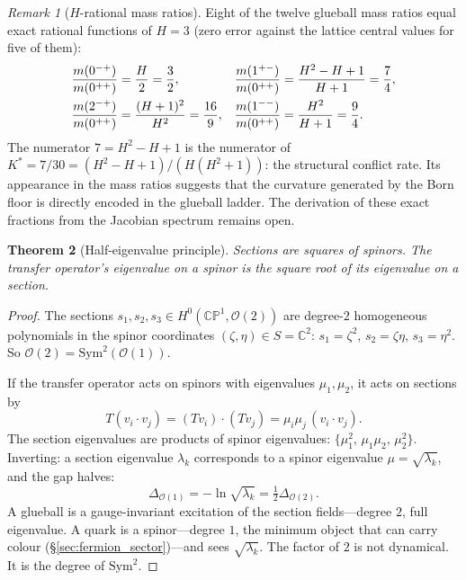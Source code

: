 \documentclass[11pt,a4paper]{article}
\newtheorem{theorem}{Theorem}[section]
\theoremstyle{definition}
\theoremstyle{remark}
\newtheorem{remark}[theorem]{Remark}
\newcommand{\CP}{\mathbb{CP}}
\newcommand{\C}{\mathbb{C}}
\newcommand{\Sym}{\mathrm{Sym}}
\begin{document}
\begin{remark}[$H$-rational mass ratios]\label{rem:h_rational}
Eight of the twelve glueball mass ratios equal exact rational functions of $H=3$ (zero error against the lattice central values for five of them):
\begin{align}
\frac{m(0^{-+})}{m(0^{++})} &= \frac{H}{2} = \frac{3}{2}, &
\frac{m(1^{+-})}{m(0^{++})} &= \frac{H^2-H+1}{H+1} = \frac{7}{4}, \notag \\
\frac{m(2^{-+})}{m(0^{++})} &= \frac{(H+1)^2}{H^2} = \frac{16}{9}, &
\frac{m(1^{--})}{m(0^{++})} &= \frac{H^2}{H+1} = \frac{9}{4}. \label{eq:h_ratios}
\end{align}
The numerator $7=H^2-H+1$ is the numerator of $K^*=7/30=(H^2-H+1)/(H(H^2+1))$: the structural conflict rate. Its appearance in the mass ratios suggests that the curvature generated by the Born floor is directly encoded in the glueball ladder. The derivation of these exact fractions from the Jacobian spectrum remains open.
\end{remark}

\begin{theorem}[Half-eigenvalue principle]\label{thm:half_eigenvalue}
Sections are squares of spinors. The transfer operator's eigenvalue on a spinor is the square root of its eigenvalue on a section.
\end{theorem}

\begin{proof}
The sections $s_1,s_2,s_3\in H^0(\CP^1,\mathcal{O}(2))$ are degree-$2$ homogeneous polynomials in the spinor coordinates $(\zeta,\eta)\in S=\C^2$: $s_1=\zeta^2$, $s_2=\zeta\eta$, $s_3=\eta^2$. So $\mathcal{O}(2)=\Sym^2(\mathcal{O}(1))$.

If the transfer operator acts on spinors with eigenvalues $\mu_1,\mu_2$, it acts on sections by
\[
T(v_i\cdot v_j) = (Tv_i)\cdot(Tv_j) = \mu_i\mu_j\,(v_i\cdot v_j).
\]
The section eigenvalues are products of spinor eigenvalues: $\{\mu_1^2,\,\mu_1\mu_2,\,\mu_2^2\}$. Inverting: a section eigenvalue $\lambda_k$ corresponds to a spinor eigenvalue $\mu=\sqrt{\lambda_k}$, and the gap halves:
\begin{equation}\label{eq:half_eigenvalue}
\Delta_{\mathcal{O}(1)} = -\ln\sqrt{\lambda_k} = \tfrac{1}{2}\Delta_{\mathcal{O}(2)}.
\end{equation}
A glueball is a gauge-invariant excitation of the section fields---degree $2$, full eigenvalue. A quark is a spinor---degree $1$, the minimum object that can carry colour (\S\ref{sec:fermion_sector})---and sees $\sqrt{\lambda_k}$. The factor of $2$ is not dynamical. It is the degree of $\Sym^2$.
\end{proof}
\end{document}
